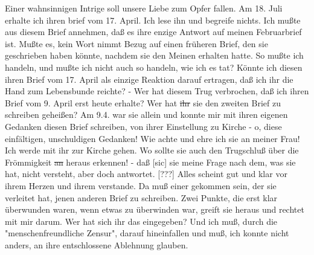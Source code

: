 \def\day{22. juli 1944.}
\mktitle

Einer wahnsinnigen Intrige soll unsere Liebe zum Opfer fallen.
Am 18. Juli erhalte ich ihren brief vom 17. April.
Ich lese ihn und begreife nichts.
Ich mu{\ss}te aus diesem Brief annehmen, da{\ss} es ihre enzige Antwort auf meinen Februarbrief ist.
Mu{\ss}te es, kein Wort nimmt Bezug auf einen fr\"{u}heren Brief, den sie geschrieben haben k\"{o}nnte, nachdem sie den Meinen erhalten hatte.
So mu{\ss}te ich handeln, und mu{\ss}te ich nicht auch so handeln, wie ich es tat?
K\"{o}nnte ich diesen ihren Brief vom 17. April als einzige Reaktion darauf ertragen, da{\ss} ich ihr die Hand zum Lebensbunde reichte? -
Wer hat diesem Trug verbrochen, da{\ss} ich ihren Brief vom 9. April erst heute erhalte?
Wer hat \st{ihr} sie den zweiten Brief zu schreiben gehei{\ss}en?
Am 9.4. war sie allein und konnte mir mit ihren eigenen Gedanken diesen Brief schreiben, von ihrer Einstellung zu Kirche - o, diese einf\"{a}ltigen, unschuldigen Gedanken!
Wie achte und ehre ich sie an meiner Frau!
Ich werde mit ihr zur Kirche gehen.
Wo sollte sie auch den Trugschlu{\ss} \"{u}ber die Fr\"{o}mmigkeit \st{an} heraus erkennen! -
da{\ss}{\color{red} [sic] sie meine Frage nach dem, was sie hat, nicht versteht, aber doch antwortet. [???] }
Alles scheint gut und klar vor ihrem Herzen und ihrem verstande.
Da mu{\ss} einer gekommen sein, der sie verleitet hat, jenen anderen Brief zu schreiben.
Zwei Punkte, die erst klar \"{u}berwunden waren, wenn etwas zu \"{u}berwinden war, greift sie heraus und rechtet mit mir darum.
Wer hat sich ihr das eingegeben?
Und ich mu{\ss}, durch die "menschenfreundliche Zensur", darauf hineinfallen und mu{\ss}, ich konnte nicht anders, an ihre entschlossene Ablehnung glauben.

\clearpage

